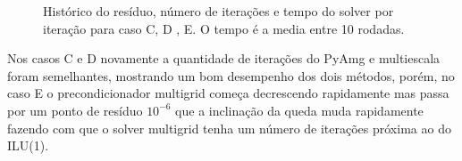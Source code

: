 \begin{figure}[]
\center
{}


\qquad
{}

\caption{ Histórico do resíduo, número de iterações e tempo do solver por iteração para caso C, D , E. O tempo é a media entre 10 rodadas. }

\label{fig:resultadosCDE}
\end{figure}

Nos casos C e D novamente a quantidade de iterações do PyAmg e multiescala foram semelhantes, mostrando um bom desempenho dos dois métodos, porém, no caso E o precondicionador multigrid começa decrescendo rapidamente mas passa por um ponto de resíduo $10^{-6}$ que a inclinação da queda muda rapidamente fazendo com que o solver multigrid tenha um número de iterações próxima ao do ILU(1). 


